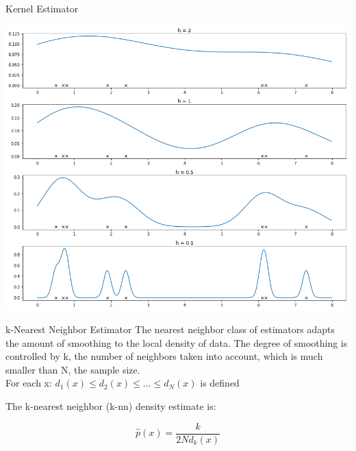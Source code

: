 \documentclass{beamer}
\begin{document}
\begin{frame}[fragile]{Kernel Estimator}
  \begin{center}
    \includegraphics[height=0.9\textheight]{images/kernel_estimator.png}
  \end{center}
\end{frame}

\begin{frame}[fragile]{k-Nearest Neighbor Estimator}
The nearest neighbor class of estimators adapts the amount of smoothing
to the local density of data. The degree of smoothing is controlled by k,
the number of neighbors taken into account, which is much smaller than
N, the sample size.\\For each x:  \:  \(  d_{1}(x)\leqslant d_{2}(x)\leqslant  ...\leqslant d_{N}(x)\)\: is defined
  
 The k-nearest neighbor (k-nn) density estimate is:

	\begin{equation}
		\hat p(x)=\frac{k}{2Nd_{k}(x)}
	\end{equation}
   

\end{frame}
\end{document}
